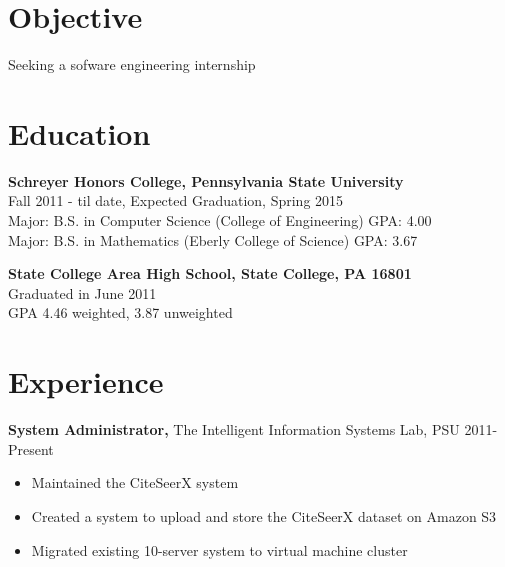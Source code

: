 \documentclass[margin]{res}
\begin{document}
 
\address{{\bf Present Address} \\ 664 D East Prospect Avenue \\ State College, PA 16801 \\
        (814) 574-8768 }
\address{{\bf Permanent Address} \\ 3144 Williamsburg Court \\ State College, PA 16801 \\
        (814) 954-0111 } 
\begin{resume} 
 
\section{Objective} 
Seeking a sofware engineering internship 

\section{Education} 
{\bf Schreyer Honors College, Pennsylvania State University} \\
Fall 2011 - til date, Expected Graduation, Spring 2015 \\
Major: B.S. in Computer Science (College of Engineering) GPA: 4.00 \\
Major: B.S. in Mathematics (Eberly College of Science) GPA: 3.67

{\bf State College Area High School, State College, PA 16801} \\
Graduated in June 2011 \\
GPA 4.46 weighted, 3.87 unweighted

\section{Experience}
{\bf System Administrator,} The Intelligent Information Systems Lab, PSU \hfill 2011-Present
\begin{itemize} \itemsep -2pt  %
\item Maintained the CiteSeerX system 
\item Created a system to upload and store the CiteSeerX dataset on Amazon S3
\item Migrated existing 10-server system to virtual machine cluster 
\end{itemize}
 

\end{resume}
\end{document}
